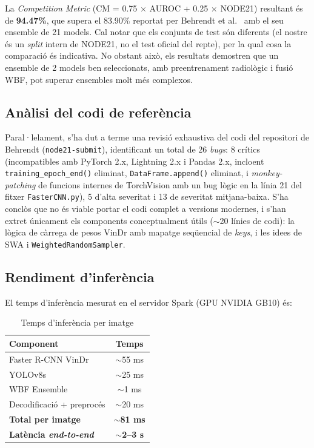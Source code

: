 \documentclass[conference]{IEEEtran}
\begin{document}
La \textit{Competition Metric} (CM = 0.75 $\times$ AUROC + 0.25 $\times$ NODE21) resultant és de \textbf{94.47\%}, que supera el 83.90\% reportat per Behrendt et al.~\cite{behrendt2023node21} amb el seu ensemble de 21 models. Cal notar que els conjunts de test són diferents (el nostre és un \textit{split} intern de NODE21, no el test oficial del repte), per la qual cosa la comparació és indicativa. No obstant això, els resultats demostren que un ensemble de 2 models ben seleccionats, amb preentrenament radiològic i fusió WBF, pot superar ensembles molt més complexos.

\subsection{Anàlisi del codi de referència}

Paral·lelament, s'ha dut a terme una revisió exhaustiva del codi del repositori de Behrendt (\texttt{node21-submit}), identificant un total de 26 \textit{bugs}: 8 crítics (incompatibles amb PyTorch 2.x, Lightning 2.x i Pandas 2.x, incloent \texttt{training\_epoch\_end()} eliminat, \texttt{DataFrame.append()} eliminat, i \textit{monkey-patching} de funcions internes de TorchVision amb un bug lògic en la línia 21 del fitxer \texttt{FasterCNN.py}), 5 d'alta severitat i 13 de severitat mitjana-baixa. S'ha conclòs que no és viable portar el codi complet a versions modernes, i s'han extret únicament els components conceptualment útils ($\sim$20 línies de codi): la lògica de càrrega de pesos VinDr amb mapatge seqüencial de \textit{keys}, i les idees de SWA i \texttt{WeightedRandomSampler}.

\subsection{Rendiment d'inferència}

El temps d'inferència mesurat en el servidor Spark (GPU NVIDIA GB10) és:

\begin{table}[H]
\centering
\caption{Temps d'inferència per imatge}
\label{tab:inference}
\begin{tabular}{lc}
\toprule
\textbf{Component} & \textbf{Temps} \\
\midrule
Faster R-CNN VinDr & $\sim$55 ms \\
YOLOv8s & $\sim$25 ms \\
WBF Ensemble & $\sim$1 ms \\
Decodificació + preprocés & $\sim$20 ms \\
\midrule
\textbf{Total per imatge} & \textbf{$\sim$81 ms} \\
\textbf{Latència \textit{end-to-end}} & \textbf{$\sim$2--3 s} \\
\bottomrule
\end{tabular}
\end{table}
\end{document}
